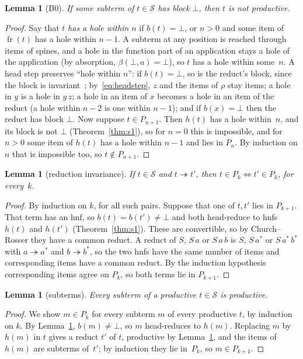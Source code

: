 \documentclass[11pt]{amsart}
\newtheorem{lemma}[theorem]{Lemma}
\theoremstyle{definition}
\theoremstyle{remark}
\newcommand{\spine}{\operatorname{fr}}
\begin{document}
\begin{lemma}[B0]\label{lem:b0}
If some subterm of $t\in\mathcal S$ has block $\bot$, then $t$ is not productive.
\end{lemma}
\begin{proof}
Say that $t$ \emph{has a hole within $n$} if $b(t)=\bot$, or $n>0$ and some item of
$\spine(t)$ has a hole within $n-1$. A subterm at any position is reached through items of
spines, and a hole in the function part of an application stays a hole of the application
(by absorption, $\beta(\bot,a)=\bot$), so $t$ has a hole within some~$n$. A head step
preserves ``hole within $n$'': if $b(t)=\bot$, so is the reduct's block, since the block is
invariant~\citep{s1}; by~\eqref{eq:headstep}, $z$ and the items of $\rho$ stay items; a hole
in $y$ is a hole in $y\,z$; a hole in an item of $x$ becomes a hole in an item of the reduct
(a hole within $n-2$ is one within $n-1$); and if $b(x)=\bot$ then the reduct has block $\bot$. Now suppose $t\in P_{n+1}$.
Then $h(t)$ has a hole within~$n$, and its block is not $\bot$ (Theorem~\ref{thm:s1}), so
for $n=0$ this is impossible, and for $n>0$ some item of $h(t)$ has a hole within $n-1$ and
lies in $P_n$. By induction on $n$ that is impossible too, so $t\notin P_{n+1}$.
\end{proof}

\begin{lemma}[reduction invariance]\label{lem:ci}
If $t\in\mathcal S$ and $t\twoheadrightarrow t'$, then $t\in P_k\iff t'\in P_k$, for every~$k$.
\end{lemma}
\begin{proof}
By induction on $k$, for all such pairs. Suppose that one of $t,t'$ lies in $P_{k+1}$. That term
has an hnf, so $b(t)=b(t')\ne\bot$ and both head-reduce to hnfs $h(t)$ and $h(t')$
(Theorem~\ref{thm:s1}). These are convertible, so by Church--Rosser they have a common
reduct. A reduct of $S$, $S\,a$ or $S\,a\,b$ is $S$, $S\,a^*$ or $S\,a^*\,b^*$ with
$a\twoheadrightarrow a^*$ and $b\twoheadrightarrow b^*$, so the two hnfs have the same
number of items and corresponding items have a common reduct. By the induction hypothesis
corresponding items agree on $P_k$, so both terms lie in $P_{k+1}$.
\end{proof}

\begin{lemma}[subterms]\label{lem:sub}
Every subterm of a productive $t\in\mathcal S$ is productive.
\end{lemma}
\begin{proof}
We show $m\in P_k$ for every subterm $m$ of every productive $t$, by induction on $k$. By
Lemma~\ref{lem:b0}, $b(m)\ne\bot$, so $m$ head-reduces to $h(m)$. Replacing $m$ by $h(m)$ in
$t$ gives a reduct $t'$ of $t$, productive by Lemma~\ref{lem:ci}, and the items of $h(m)$
are subterms of~$t'$; by induction they lie in~$P_k$, so $m\in P_{k+1}$.
\end{proof}
\end{document}
